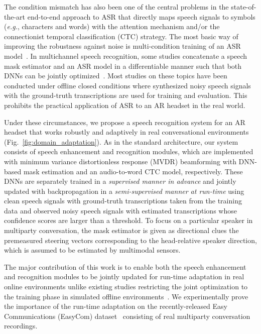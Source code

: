 \documentclass[a4paper]{article}
\newcommand{\eg}{\textit{e.g.}}
\begin{document}
The condition mismatch
 has also been one of the central problems in 
 the state-of-the-art end-to-end approach to ASR 
 that directly maps speech signals to symbols (\eg, characters and words)
 with the attention mechanism 
 and/or the connectionist temporal classification (CTC) strategy.
The most basic way of improving the robustness against noise
 is multi-condition training of an ASR model~\cite{multiconditionASR2015, multiconditionASR2019}.
In multichannel speech recognition,
 some studies concatenate a speech mask estimator and an ASR model 
 in a differentiable manner
 such that both DNNs can be jointly optimized~\cite{Ochiai2017a,Subramanian2020}.
Most studies on these topics have been conducted under offline closed conditions
 where synthesized noisy speech signals with the ground-truth transcriptions
 are used for training and evaluation.
This prohibits the practical application of ASR to an AR headset in the real world.

Under these circumstances,
 we propose a speech recognition system for an AR headset
 that works robustly and adaptively in real conversational environments
 (Fig.~\ref{fig:domain_adaptation}).
As in the standard architecture,
 our system consists of speech enhancement and recognition modules,
 which are implemented 
 with minimum variance distortionless response (MVDR) beamforming 
 with DNN-based mask estimation
 and an audio-to-word CTC model, respectively.
These DNNs are separately trained in a \textit{supervised manner in advance}
 and jointly updated with backpropagation in a \textit{semi-supervised manner at run-time}
 using clean speech signals with ground-truth transcriptions taken from the training data
 and observed noisy speech signals with estimated transcriptions
 whose confidence scores are larger than a threshold.
To focus on a particular speaker in multiparty conversation,
 the mask estimator is given as directional clues 
 the premeasured steering vectors corresponding 
 to the head-relative speaker direction,
 which is assumed to be estimated by multimodal sensors.

The major contribution of this work
 is to enable both the speech enhancement and recognition modules
 to be jointly updated for run-time adaptation in real online environments
 unlike existing studies restricting the joint optimization 
 to the training phase in simulated offline environments~\cite{Ochiai2017a}.
We experimentally prove the importance of the run-time adaptation 
 on the recently-released Easy Communications (EasyCom) dataset~\cite{donley2021easycom}
 consisting of real multiparty conversation recordings.
\end{document}
